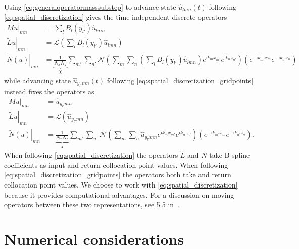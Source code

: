 \documentclass[letterpaper,11pt,nointlimits,reqno]{amsart}
\newcommand{\ii}{\ensuremath{\mathrm{i}}}
\begin{document}
Using \eqref{eq:generaloperatormasssubstep} to advance state
$\hat{u}_{l m n}(t)$ following \eqref{eq:spatial_discretization} gives
the time-independent discrete operators
\begin{subequations}
\begin{align}
   M u\bigr|_{m n}
&= \sum_{l} B_l\!\left(y_{l'}\right)
   \hat{u}_{l m n}
\\
   \left.\tilde{L} u\right|_{m n}
&= \mathscr{L}\left(
     \sum_{l}
     B_l\!\left(y_{l'}\right)
     \hat{u}_{l m n}
   \right)
\\
   \left.\tilde{N}\!\left(u\right)\right|_{m n}
&= \underbrace{\frac{1}{N_x N_z}}_{\chi}
   \sum_{m'} \sum_{n'}
   \mathscr{N}\left(
     \sum_{m}
     \sum_{n}
     \left(
       \sum_{l} B_l\!\left(y_{l'}\right)
       \hat{u}_{l m n}
     \right)
     e^{\ii k_m x_{m'}}e^{\ii k_n z_{n'}}
   \right)
   \left(
     e^{-\ii k_{m'} x_m}e^{-\ii k_{n'} z_n}
   \right)
\end{align}
\end{subequations}
while advancing state $\hat{u}_{y_{l'} m n}(t)$ following
\eqref{eq:spatial_discretization_gridpoints} instead fixes the operators as
\begin{subequations}
\begin{align}
   M u\bigr|_{m n}
&= \hat{u}_{y_{l'} m n}
\\
   \left.\tilde{L} u\right|_{m n}
&= \mathscr{L}\left(\hat{u}_{y_{l'} m n}\right)
\\
   \left.\tilde{N}\!\left(u\right)\right|_{m n}
&= \underbrace{\frac{1}{N_x N_z}}_{\chi}
   \sum_{m'} \sum_{n'}
   \mathscr{N}\left(
     \sum_{m}
     \sum_{n}
     \hat{u}_{y_{l'} m n}
     e^{\ii k_m x_{m'}}e^{\ii k_n z_{n'}}
   \right)
   \left(
     e^{-\ii k_{m'} x_m}e^{-\ii k_{n'} z_n}
   \right)
   .
\end{align}
\end{subequations}
When following \eqref{eq:spatial_discretization} the operators $\tilde{L}$ and
$\tilde{N}$ take B-spline coefficients as input and return collocation point
values.  When following \eqref{eq:spatial_discretization_gridpoints} the
operators both take and return collocation point values.  We choose to work
with \eqref{eq:spatial_discretization} because it provides computational
advantages.  For a discussion on moving operators between these two
representations, see \textsection{}5.5 in~\cite{Boyd2001}.

\section{Numerical considerations}
\end{document}
